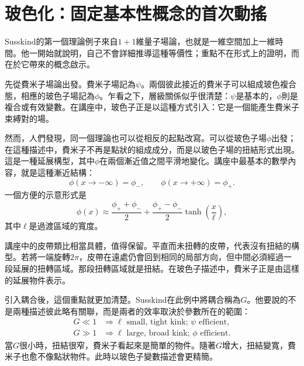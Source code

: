 \section{玻色化：固定基本性概念的首次動搖}

Susskind的第一個理論例子來自\(1+1\)維量子場論，也就是一維空間加上一維時間。他一開始就說明，自己不會詳細推導這種等價性；重點不在形式上的證明，而在於它帶來的概念啟示。

先從費米子場論出發。費米子場記為\(\psi\)。兩個彼此接近的費米子可以組成玻色複合態，相應的玻色子場記為\(\phi\)。乍看之下，層級關係似乎很清楚：\(\psi\)是基本的，\(\phi\)則是複合或有效變數。在講座中，玻色子正是以這種方式引入：它是一個能產生費米子束縛對的場。

然而，人們發現，同一個理論也可以從相反的起點改寫。可以從玻色子場\(\phi\)出發；在這種描述中，費米子不再是點狀的組成成分，而是以玻色子場的扭結形式出現。這是一種延展構型，其中\(\phi\)在兩個漸近值之間平滑地變化。講座中最基本的數學內容，就是這種漸近結構：
\begin{equation}
\phi(x\to -\infty)=\phi_-,
\qquad
\phi(x\to +\infty)=\phi_+.
\end{equation}
一個方便的示意形式是
\begin{equation}
\phi(x)\approx \frac{\phi_++\phi_-}{2}
+
\frac{\phi_+-\phi_-}{2}\tanh\!\left(\frac{x}{\ell}\right),
\end{equation}
其中\(\ell\)是過渡區域的寬度。


講座中的皮帶類比相當具體，值得保留。平直而未扭轉的皮帶，代表沒有扭結的構型。若將一端旋轉\(2\pi\)，皮帶在遠處仍會回到相同的局部方向，但中間必須經過一段延展的扭轉區域。那段扭轉區域就是扭結。在玻色子描述中，費米子正是由這樣的延展物件表示。

引入耦合後，這個重點就更加清楚。Susskind在此例中將耦合稱為\(G\)。他要說的不是兩種描述彼此略有關聯，而是兩者的效率取決於參數所在的範圍：
\begin{align}
G \ll 1
&\Rightarrow
\ell\text{ small, tight kink; }\psi\text{ efficient},\\
G \gg 1
&\Rightarrow
\ell\text{ large, broad kink; }\phi\text{ efficient}.
\end{align}
當\(G\)很小時，扭結很窄，費米子看起來是簡單的物件。隨著\(G\)增大，扭結變寬，費米子也愈不像點狀物件。此時以玻色子變數描述會更精簡。

